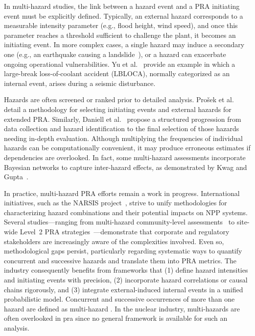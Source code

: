 In multi-hazard studies, the link between a hazard event and a PRA initiating event must be explicitly defined. Typically, an external hazard corresponds to a measurable intensity parameter (e.g., flood height, wind speed), and once this parameter reaches a threshold sufficient to challenge the plant, it becomes an initiating event. In more complex cases, a single hazard may induce a secondary one (e.g., an earthquake causing a landslide~\cite{Kwag2018Development}), or a hazard can exacerbate ongoing operational vulnerabilities. Yu et al.~\cite{Yu2015Large} provide an example in which a large-break loss-of-coolant accident (LBLOCA), normally categorized as an internal event, arises during a seismic disturbance.

Hazards are often screened or ranked prior to detailed analysis. Prošek et al.~\cite{Prosek2017Methodology} detail a methodology for selecting initiating events and external hazards for extended PRA. Similarly, Daniell et al.~\cite{Daniell2019Review} propose a structured progression from data collection and hazard identification to the final selection of those hazards needing in-depth evaluation. Although multiplying the frequencies of individual hazards can be computationally convenient, it may produce erroneous estimates if dependencies are overlooked. In fact, some multi-hazard assessments incorporate Bayesian networks to capture inter-hazard effects, as demonstrated by Kwag and Gupta~\cite{Kwag2017Probabilistic}.

In practice, multi-hazard PRA efforts remain a work in progress. International initiatives, such as the NARSIS project~\cite{Home}, strive to unify methodologies for characterizing hazard combinations and their potential impacts on NPP systems. Several studies—ranging from multi-hazard community-level assessments~\cite{Li2009Ranking} to site-wide Level~2 PRA strategies~\cite{Cooper2013What}—demonstrate that corporate and regulatory stakeholders are increasingly aware of the complexities involved. Even so, methodological gaps persist, particularly regarding systematic ways to quantify concurrent and successive hazards and translate them into PRA metrics. The industry consequently benefits from frameworks that (1) define hazard intensities and initiating events with precision, (2) incorporate hazard correlations or causal chains rigorously, and (3) integrate external-induced internal events in a unified probabilistic model.
Concurrent and successive occurrences of more than one hazard are defined as multi-hazard \cite{Choi2021review}. In the nuclear industry, multi-hazards are often overlooked in \acrshort{pra} since no general framework is available for such an analysis.

